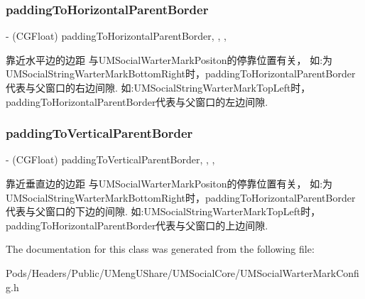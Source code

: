 \subsubsection{\texorpdfstring{padding\+To\+Horizontal\+Parent\+Border}{paddingToHorizontalParentBorder}}
{\footnotesize\ttfamily -\/ (C\+G\+Float) padding\+To\+Horizontal\+Parent\+Border\hspace{0.3cm}{\ttfamily [read]}, {\ttfamily [write]}, {\ttfamily [nonatomic]}, {\ttfamily [assign]}}

靠近水平边的边距 与\+U\+M\+Social\+Warter\+Mark\+Positon的停靠位置有关， 如\+:为\+U\+M\+Social\+String\+Warter\+Mark\+Bottom\+Right时，padding\+To\+Horizontal\+Parent\+Border代表与父窗口的右边间隙. 如\+:U\+M\+Social\+String\+Warter\+Mark\+Top\+Left时，padding\+To\+Horizontal\+Parent\+Border代表与父窗口的左边间隙. \mbox{\label{interface_u_m_social_string_warter_mark_config_aa44b8fc5deafd39153db4469e253cd9d}} 
\subsubsection{\texorpdfstring{padding\+To\+Vertical\+Parent\+Border}{paddingToVerticalParentBorder}}
{\footnotesize\ttfamily -\/ (C\+G\+Float) padding\+To\+Vertical\+Parent\+Border\hspace{0.3cm}{\ttfamily [read]}, {\ttfamily [write]}, {\ttfamily [nonatomic]}, {\ttfamily [assign]}}

靠近垂直边的边距 与\+U\+M\+Social\+Warter\+Mark\+Positon的停靠位置有关， 如\+:为\+U\+M\+Social\+String\+Warter\+Mark\+Bottom\+Right时，padding\+To\+Horizontal\+Parent\+Border代表与父窗口的下边的间隙. 如\+:U\+M\+Social\+String\+Warter\+Mark\+Top\+Left时，padding\+To\+Horizontal\+Parent\+Border代表与父窗口的上边间隙. 

The documentation for this class was generated from the following file\+:\begin{DoxyCompactItemize}
\item 
Pods/\+Headers/\+Public/\+U\+Meng\+U\+Share/\+U\+M\+Social\+Core/U\+M\+Social\+Warter\+Mark\+Config.\+h\end{DoxyCompactItemize}
